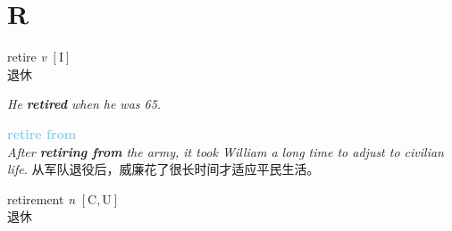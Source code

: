 \section{R}

\item[] {
    \lettrine{retire}{}  
    \textit{v} 
    $\mathrm{[I]}$ \\
    退休

    \textit{He \textbf{retired} when he was 65.}

    \textbf {
        \textcolor{SkyBlue} {
            retire from
        }
    } \\
    \textit{After \textbf{retiring from} the army, it took William a long time to adjust to civilian life.} 
    从军队退役后，威廉花了很长时间才适应平民生活。

} 

\item[] {
    \lettrine{retirement}{}  
    \textit{n} 
    $\mathrm{[C, U]}$ \\
    退休

} 